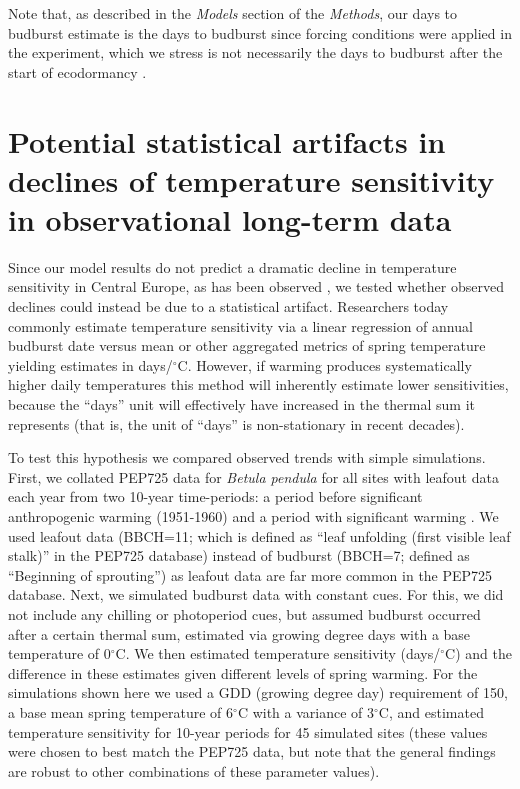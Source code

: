 \documentclass{article}
\begin{document}
\par Note that, as described in the \emph{Models} section of the \emph{Methods}, our days to budburst estimate is the days to budburst since forcing conditions were applied in the experiment, which we stress is not necessarily the days to budburst after the start of ecodormancy \emph{\citep{chuine2016}}.

\section*{Potential statistical artifacts in declines of temperature sensitivity in observational long-term data} 

Since our model results do not predict a dramatic decline in temperature sensitivity in Central Europe, as has been observed \emph{\citep[e.g.,][]{fu2015}}, we tested whether observed declines could instead be due to a statistical artifact. Researchers today commonly estimate temperature sensitivity via a linear regression of annual budburst date versus mean or other aggregated metrics of spring temperature yielding estimates in days/$^{\circ}$C. However, if warming produces systematically higher daily temperatures this method will inherently estimate lower sensitivities, because the ``days'' unit will effectively have increased in the thermal sum it represents (that is, the unit of ``days'' is non-stationary in recent decades).
\par To test this hypothesis we compared observed trends with simple simulations. First, we collated PEP725 data \emph{\citep{Templ2018}} for \emph{Betula pendula} for all sites with leafout data each year from two 10-year time-periods: a period before significant anthropogenic warming (1951-1960) and a period with significant warming \emph{\citep[{-2010, see}][]{IPCC:2014sm}}. We used leafout data (BBCH=11; which is defined as ``leaf unfolding (first visible leaf stalk)'' in the PEP725 database) instead of budburst (BBCH=7; defined as ``Beginning of sprouting'') as leafout data are far more common in the PEP725 database. Next, we simulated budburst data with constant cues. For this, we did not include any chilling or photoperiod cues, but assumed budburst occurred after a certain thermal sum, estimated via growing degree days with a base temperature of 0$^{\circ}$C. We then estimated temperature sensitivity (days/$^{\circ}$C) and the difference in these estimates given different levels of spring warming. For the simulations shown here we used a GDD (growing degree day) requirement of 150, a base mean spring temperature of 6$^{\circ}$C with a variance of 3$^{\circ}$C, and estimated temperature sensitivity for 10-year periods for 45 simulated sites (these values were chosen to best match the PEP725 data, but note that the general findings are robust to other combinations of these parameter values).
\end{document}
